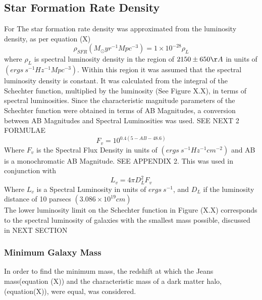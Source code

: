 \documentclass[pdf,color]{UoBnote}
\begin{document}

\subsection{Star Formation Rate Density}
For The star formation rate density was approximated from the luminosity density, as per equation (X) \cite{interactions_and_Induced_Star_Formation}
\begin{equation}
\rho_{SFR}(M_\odot yr^{-1} Mpc^{-3})=1\times 10^{-28} \rho_L 
\end{equation}
where $\rho_L$ is spectral luminosity density in the region of $2150\pm 650 \AA$ in units of $(ergs \ s^{-1} Hz^{-1} Mpc^{-3})$. Within this region it was assumed that the spectral luminosity density is constant. It was calculated from the integral of the Schechter function, multiplied by the luminosity (See Figure X.X), in terms of spectral luminosities. Since the characteristic magnitude parameters of the Schechter function were obtained in terms of AB Magnitudes, a conversion between AB Magnitudes and Spectral Luminosities was used. SEE NEXT 2 FORMULAE
\begin{equation}
F_v = 10^{0.4(5-AB-48.6)} 
\end{equation}
Where $F_v$ is the Spectral Flux Density in units of $(ergs \ s^{-1} Hz^{-1} cm^{-2})$ and AB is a monochromatic AB Magnitude. SEE APPENDIX 2. This was used in conjunction with
\begin{equation}
L_v=4\pi D_L^2 F_v
\end{equation} 
Where $L_v$ is a Spectral Luminosity in units of $ergs \ s^{-1}$, and $D_L$ if the luminosity distance of 10 parsecs $(3.086\times10^19 cm)$ \\
\newline
The lower luminosity limit on the Schechter function in Figure (X.X) corresponds to the spectral luminosity of galaxies with the smallest mass possible, discussed in NEXT SECTION
\subsubsection{Minimum Galaxy Mass}
In order to find the minimum mass, the redshift at which the Jeans mass(equation (X)) and the characteristic mass of a dark matter halo, (equation(X)), were equal, was considered.\cite{Barkana2001125}
\end{document}
